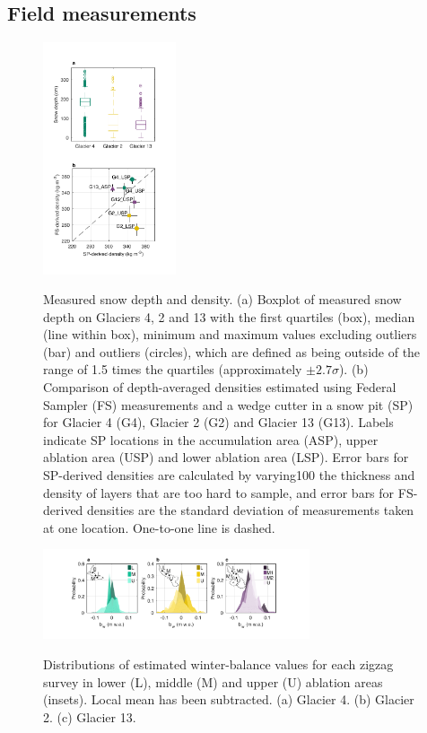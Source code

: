 \documentclass[twocolumn, letterpaper]{igs}
\begin{document}
\subsection{Field measurements}

\begin{figure}
	\centering
	\includegraphics[width =0.35\textwidth]{DepthBoxplot_SPvsFS.pdf}\\
	\caption{Measured snow depth and density. (a) Boxplot of measured snow depth on Glaciers 4, 2 and 13 with the first quartiles (box), median (line within box), minimum and maximum values excluding outliers (bar) and outliers (circles), which are defined as being outside of the range of 1.5 times the quartiles (approximately $\pm2.7\sigma$). (b) Comparison of depth-averaged densities estimated using Federal Sampler (FS) measurements and  a wedge cutter in a snow pit (SP)  for Glacier 4 (G4), Glacier 2 (G2) and Glacier 13 (G13). Labels indicate SP locations in the accumulation area (ASP), upper ablation area (USP) and lower ablation area (LSP). Error bars for SP-derived densities are calculated by varying100 the thickness and density of layers that are too hard to sample, and error bars for FS-derived densities are the standard deviation of measurements taken at one location. One-to-one line is dashed.}
	\label{fig:DepthBoxplot_SPvsFS}
\end{figure}

\begin{figure}
	\centering
	\includegraphics[width =0.7\textwidth]{ZigzagHistogram.pdf}\\
	\caption{Distributions of estimated winter-balance values for each zigzag survey in lower (L), middle (M) and upper (U) ablation areas (insets). Local mean has been subtracted. (a) Glacier 4. (b) Glacier 2. (c) Glacier 13.}
	\label{fig:ZigzagHistogram}
\end{figure}
\end{document}
